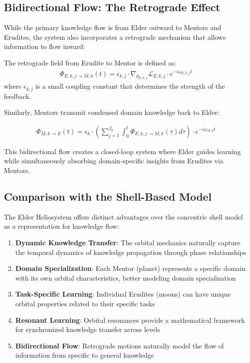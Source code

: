 \subsection{Bidirectional Flow: The Retrograde Effect}

While the primary knowledge flow is from Elder outward to Mentors and Erudites, the system also incorporates a retrograde mechanism that allows information to flow inward:

\begin{definition}
The retrograde field from Erudite to Mentor is defined as:
\begin{align}
\Phi_{E,k,j \rightarrow M,k}(t) = \epsilon_{k,j} \cdot \nabla_{\theta_{E,k,j}}\mathcal{L}_{E,k,j} \cdot e^{-i\omega_{E,k,j}t}
\end{align}
where $\epsilon_{k,j}$ is a small coupling constant that determines the strength of the feedback.
\end{definition}

Similarly, Mentors transmit condensed domain knowledge back to Elder:

\begin{align}
\Phi_{M,k \rightarrow E}(t) = \epsilon_k \cdot \left(\sum_{j=1}^{J_k} \int_0^t \Phi_{E,k,j \rightarrow M,k}(\tau) d\tau\right) \cdot e^{-i\omega_{M,k}t}
\end{align}

This bidirectional flow creates a closed-loop system where Elder guides learning while simultaneously absorbing domain-specific insights from Erudites via Mentors.

\subsection{Comparison with the Shell-Based Model}

The Elder Heliosystem offers distinct advantages over the concentric shell model as a representation for knowledge flow:

\begin{enumerate}
    \item \textbf{Dynamic Knowledge Transfer}: The orbital mechanics naturally capture the temporal dynamics of knowledge propagation through phase relationships
    \item \textbf{Domain Specialization}: Each Mentor (planet) represents a specific domain with its own orbital characteristics, better modeling domain specialization
    \item \textbf{Task-Specific Learning}: Individual Erudites (moons) can have unique orbital properties related to their specific tasks
    \item \textbf{Resonant Learning}: Orbital resonances provide a mathematical framework for synchronized knowledge transfer across levels
    \item \textbf{Bidirectional Flow}: Retrograde motions naturally model the flow of information from specific to general knowledge
\end{enumerate}

